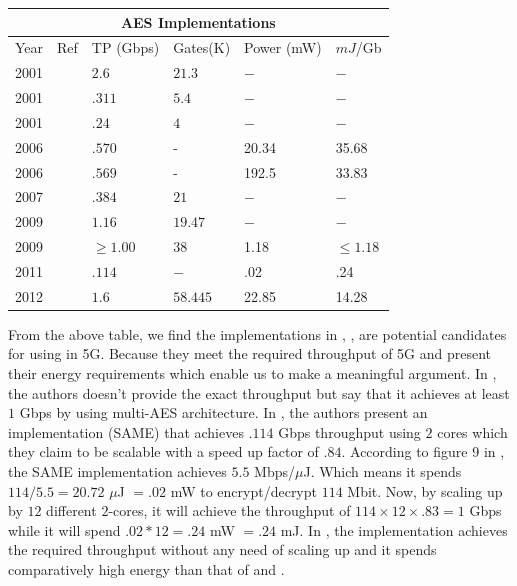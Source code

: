 \begin{tiny}
\noindent
\begin{tabular}{|p{}
				|p{}
				|p{}
				|p{}
				|p{}
				|p{}|
				}
\hline
\multicolumn{6}{|c|}{AES Implementations} \\
\hline
Year & Ref & TP (Gbps) & Gates(K) & Power (mW) & $mJ$/Gb \\
\hline
2001 & \cite{IBM_Japan_2001} &$2.6$ &$21.3$  & $-$ & $-$ \\ \hline
2001 & \cite{IBM_Japan_2001} &$.311$ &$5.4$  & $-$ & $-$ \\ \hline
2001 & \cite{IBM_India_IIT_2001} &$.24$ &$4$  & $-$ & $-$ \\ \hline
2006 & \cite{Taiwan_2006} &$.570$ & - &20.34 & 35.68 \\ \hline
2006 & \cite{Taiwan_2006} &$.569$ & - &192.5 & 33.83 \\ \hline
2007 & \cite{IIT_Kharagpur_2007} &$.384$ &$21$ & $-$  & $-$ \\ \hline
2009 & \cite{IME_China_Tsinghua_Univerisity_2009} &$1.16$ &$19.47$ & $-$ & $-$ \\ \hline
2009 & \cite{Ruhr_2009} &$\geq 1.00$ &$38$ &1.18 & $\leq 1.18$ \\ \hline
2011 & \cite{Ruhr_2011} &$.114$ &$ - $ &.02 & .24 \\ \hline
2012 & \cite{Pune_2012} &$1.6$ &$58.445$ &22.85 & 14.28 \\ \hline
\end{tabular}
\end{tiny}
\newline

From the above table, we find the implementations in \cite{Ruhr_2009}, \cite{Ruhr_2011}, \cite{Pune_2012} are potential candidates for using in 5G. Because they meet the required throughput of 5G and present their energy requirements which enable us to make a meaningful argument. In \cite{Ruhr_2009}, the authors doesn't provide the exact throughput but say that it achieves at least $1$ Gbps by using multi-AES architecture. In \cite{Ruhr_2011}, the authors present an implementation (SAME) that achieves $.114$ Gbps throughput using $2$ cores which they claim to be scalable with a speed up factor of $.84$. According to figure 9 in \cite{Ruhr_2011}, the SAME implementation achieves $5.5$ Mbps/$\mu$J. Which means it spends $114/5.5 = 20.72$ $\mu$J $=.02$ mW to encrypt/decrypt $114$ Mbit. Now, by scaling up by $12$ different $2$-cores, it will achieve the throughput of $114 \times 12 \times .83 = 1$ Gbps while it will spend $.02*12=.24$ mW $=.24$ mJ. In \cite{Pune_2012}, the implementation achieves the required throughput without any need of scaling up and it spends comparatively high energy than that of \cite{Ruhr_2009} and \cite{Ruhr_2011}. 

